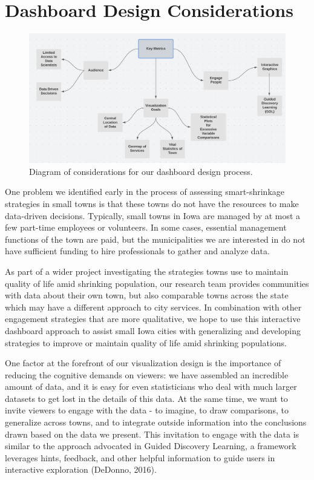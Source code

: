 \documentclass[print]{nuthesis}
\begin{document}
\hypertarget{dashboard-design-considerations}{%
\section{Dashboard Design Considerations}\label{dashboard-design-considerations}}

\begin{figure}
\hypertarget{fig:metrics}{%
\centering
\includegraphics{figure/KeyMetrics.png}
\caption{Diagram of considerations for our dashboard design process.}\label{fig:metrics}
}
\end{figure}

One problem we identified early in the process of assessing smart-shrinkage strategies in small towns is that these towns do not have the resources to make data-driven decisions. Typically, small towns in Iowa are managed by at most a few part-time employees or volunteers. In some cases, essential management functions of the town are paid, but the municipalities we are interested in do not have sufficient funding to hire professionals to gather and analyze data.

As part of a wider project investigating the strategies towns use to maintain quality of life amid shrinking population, our research team provides communities with data about their own town, but also comparable towns across the state which may have a different approach to city services. In combination with other engagement strategies that are more qualitative, we hope to use this interactive dashboard approach to assist small Iowa cities with generalizing and developing strategies to improve or maintain quality of life amid shrinking populations.

One factor at the forefront of our visualization design is the importance of reducing the cognitive demands on viewers: we have assembled an incredible amount of data, and it is easy for even statisticians who deal with much larger datasets to get lost in the details of this data. At the same time, we want to invite viewers to engage with the data - to imagine, to draw comparisons, to generalize across towns, and to integrate outside information into the conclusions drawn based on the data we present.
This invitation to engage with the data is similar to the approach advocated in Guided Discovery Learning, a framework leverages hints, feedback, and other helpful information to guide users in interactive exploration (DeDonno, 2016).
\end{document}

